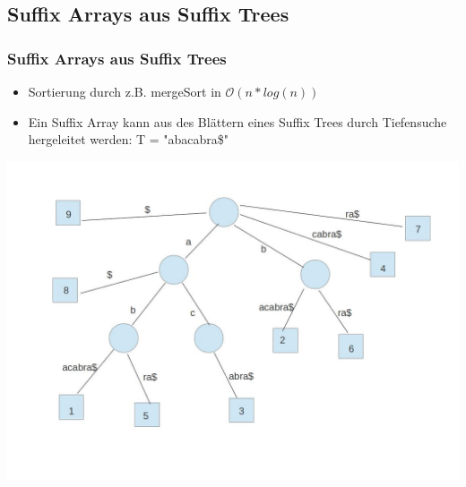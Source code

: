 \documentclass{beamer}
\begin{document}
\subsection{Suffix Arrays aus Suffix Trees}
\begin{frame}
\frametitle{Suffix Arrays aus Suffix Trees} %
\begin{itemize}
\item Sortierung durch z.B. mergeSort in $\mathcal{O}(n*log (n))$
\item Ein Suffix Array kann aus des Bl\"attern eines Suffix Trees durch Tiefensuche hergeleitet werden: T = "abacabra\$"\newline
\end{itemize}
\includegraphics[scale=0.2]{SuffixTree.jpg}
\end{frame}
\end{document}
